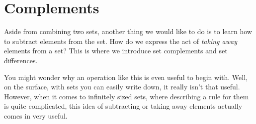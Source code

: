 \section{Complements}
Aside from combining two sets, another thing we would like to do is to learn how to subtract elements from the set. 
How do we express the act of \textit{taking away} elements from a set? This is where we introduce set complements 
and set differences. 

You might wonder why an operation like this is even useful to begin with. Well, on the surface, with sets
you can easily write down, it really isn't that useful. However, when it comes to infinitely sized sets, 
where describing a rule for them is quite complicated, this idea of subtracting or taking away elements actually 
comes in very useful.

